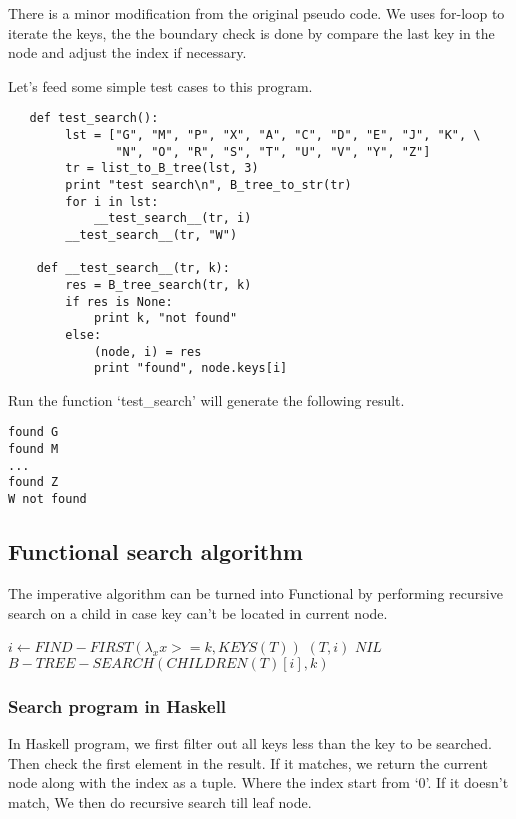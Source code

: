 \documentclass{article}
\begin{document}
There is a minor modification from the original pseudo code.
We uses for-loop to iterate the keys, the the boundary check is done
by compare the last key in the node and adjust the index if
necessary.

Let's feed some simple test cases to this program.

\begin{lstlisting}
   def test_search():
        lst = ["G", "M", "P", "X", "A", "C", "D", "E", "J", "K", \
               "N", "O", "R", "S", "T", "U", "V", "Y", "Z"]
        tr = list_to_B_tree(lst, 3)
        print "test search\n", B_tree_to_str(tr)
        for i in lst:
            __test_search__(tr, i)
        __test_search__(tr, "W")

    def __test_search__(tr, k):
        res = B_tree_search(tr, k)
        if res is None:
            print k, "not found"
        else:
            (node, i) = res
            print "found", node.keys[i]
\end{lstlisting}

Run the function `test\_search' will generate the following result.

\begin{verbatim}
found G
found M
...
found Z
W not found
\end{verbatim}

\subsection{Functional search algorithm}
The imperative algorithm can be turned into Functional by performing
recursive search on a child in case key can't be located in current
node.

\begin{algorithmic}[1]
  \State $i \gets FIND-FIRST( \lambda_xx>=k, KEYS(T))$
    \State \Return $(T, i)$
  \EndIf
    \State \Return $NIL$ 
  \Else
    \State \Return $B-TREE-SEARCH(CHILDREN(T)[i], k)$
  \EndIf
\EndFunction
\end{algorithmic}

\subsubsection*{Search program in Haskell}
In Haskell program, we first filter out all keys less than the
key to be searched. Then check the first element in the result.
If it matches, we return the current node along with the index
as a tuple. Where the index start from `0'. If it doesn't match,
We then do recursive search till leaf node.
\end{document}
